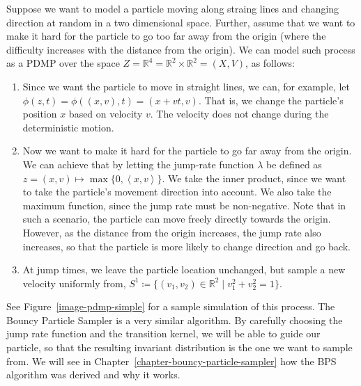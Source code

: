 \documentclass[report.tex]{subfiles}
\begin{document}
Suppose we want to model a particle moving along straing lines and changing
direction at random in a two dimensional space. Further, assume that we want to
make it hard for the particle to go too far away from the origin (where the difficulty
increases with the distance from the origin).
We can model such process as a PDMP over the space
$Z = \mathbb{R}^{4} = \mathbb{R}^{2} \times \mathbb{R}^{2} = (X, V)$,
as follows:
\begin{enumerate}
  \item Since we want the particle to move in straight lines, we can, for example,
    let $\phi(z, t) = \phi((x,v), t) = (x + vt, v)$. That is, we change the particle's
    position $x$ based on velocity $v$. The velocity does not change during the
    deterministic motion.
  \item Now we want to make it hard for the particle to go far away from the origin.
    We can achieve that by letting the jump-rate function $\lambda$ be defined as
    \mbox{$z = (x, v) \mapsto \max\{0, \left\langle x, v \right\rangle\}$}.
    We take the inner product, since we want to take the particle's movement
    direction into account. We also take the maximum function, since the jump rate
    must be non-negative. Note that in such a scenario,
    the particle can move freely directly towards the origin. However, as the
    distance from the origin increases, the jump rate also increases, so that the
    particle is more likely to change direction and go back.
  \item At jump times, we leave the particle location unchanged, but sample a new
    velocity uniformly from,
    $S^{1} \coloneqq \{(v_{1}, v_{2}) \in \mathbb{R}^{2} \mid v_{1}^{2} + v_{2}^2 = 1 \}$.
\end{enumerate}

See Figure~\ref{image-pdmp-simple} for a sample simulation of this process.
The Bouncy Particle Sampler is a very similar algorithm. By carefully choosing
the jump rate function and the transition kernel, we will be able to guide our
particle, so that the resulting invariant distribution is the one we want to sample from.
We will see in Chapter~\ref{chapter-bouncy-particle-sampler} how the BPS algorithm
was derived and why it works.
\end{document}
